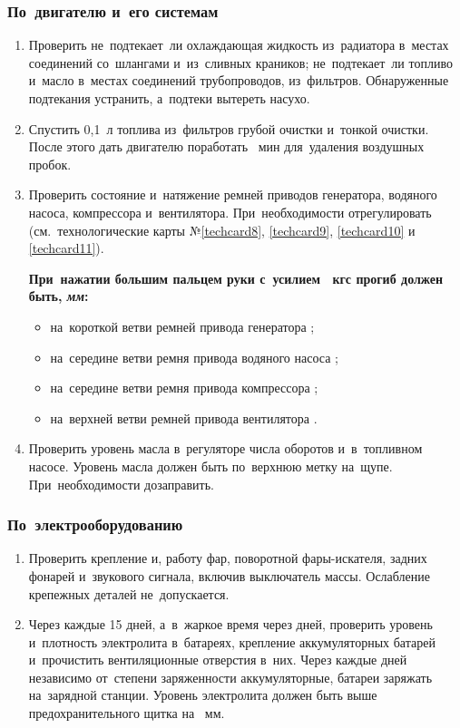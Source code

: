 \subsubsection{По~двигателю и~его системам}
\begin{enumerate}
\item Проверить не~подтекает~ли охлаждающая жидкость из~радиатора в~местах соединений со~шлангами и~из~сливных краников; не~подтекает~ли топливо и~масло в~местах соединений трубопроводов, из~фильтров. Обнаруженные подтекания устранить, а~подтеки вытереть насухо. 
\item Спустить 0,1~л топлива из~фильтров грубой очистки и~тонкой очистки. После этого дать двигателю поработать ~мин для~удаления воздушных пробок.
\item Проверить состояние и~натяжение ремней приводов генератора, водяного насоса, компрессора и~вентилятора. При~необходимости отрегулировать (см.~технологические карты №\ref{techcard8}, \ref{techcard9}, \ref{techcard10} и \ref{techcard11}). 

\textbf{При~нажатии большим пальцем руки с~усилием ~кгс прогиб должен быть, \textit{мм}:}
\begin{itemize}
    \item на~короткой ветви ремней привода генератора ; 
    \item на~середине ветви ремня привода водяного насоса ; 
    \item на~середине ветви ремня привода компрессора ;
    \item на~верхней ветви ремней привода вентилятора . 
\end{itemize}

\item Проверить уровень масла в~регуляторе числа оборотов и~в~топливном насосе. Уровень масла должен быть по~верхнюю метку на~щупе. При~необходимости дозаправить. 
\end{enumerate}


\subsubsection{По~электрооборудованию}
\begin{enumerate}
    \item Проверить крепление и, работу фар, поворотной фары-искателя, задних фонарей и~звукового сигнала, включив выключатель массы. Ослабление крепежных деталей не~допускается. 
    \item Через каждые 15 дней, а~в~жаркое время через  дней, проверить уровень и~плотность электролита в~батареях, крепление аккумуляторных батарей и~прочистить вентиляционные отверстия в~них. Через каждые  дней независимо от~степени заряженности аккумуляторные, батареи заряжать на~зарядной станции. Уровень электролита должен быть выше предохранительного щитка на ~мм. 
\end{enumerate}



